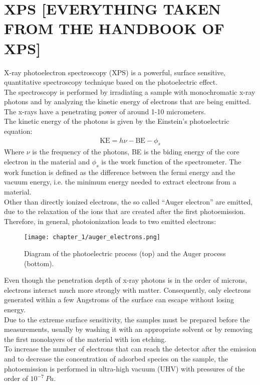 \section{XPS [EVERYTHING TAKEN FROM THE HANDBOOK OF XPS]}
\label{sec:xps}
X-ray photoelectron spectroscopy (XPS) is a powerful, surface sensitive, quantitative spectroscopy technique based on the photoelectric effect.
\\
The spectroscopy is performed by irradiating a sample with monochromatic x-ray photons and by analyzing the kinetic energy of electrons that are being emitted. The x-rays have a penetrating power of around 1-10 micrometers.
\\
The kinetic energy of the photons is given by the Einstein’s photoelectric equation:
\begin{align}
    \mathrm{KE}=h\nu-\mathrm{BE}-\phi_s \label{eq:einstein_ph_eq}
\end{align}
Where $\nu$ is the frequency of the photons, BE is the biding energy of the core electron in the material and $\phi_s$ is the work function of the spectrometer. The work function is defined as the difference between the fermi energy and the vacuum energy, i.e. the minimum energy needed to extract electrons from a material. 
\\
Other than directly ionized electrons, the so called “Auger electron” are emitted, due to the relaxation of the ions that are created after the first photoemission. Therefore, in general, photoionization leads to two emitted electrons:
\begin{figure}[H]
    \centering
    \texttt{[image: chapter\_1/auger\_electrons.png]}
    \vspace*{0pt}
    \caption{Diagram of the photoelectric process (top) and the Auger process (bottom). }
    \label{fig:auger_photoelectric}
\end{figure}
Even though the penetration depth of x-ray photons is in the order of microns, electrons interact much more strongly with matter. Consequently, only electrons generated within a few Angstroms of the surface can escape without losing energy.
\\
Due to the extreme surface sensitivity, the samples must be prepared before the measurements, usually by washing it with an appropriate solvent or by removing the first monolayers of the material with ion etching.
\\
To increase the number of electrons that can reach the detector after the emission and to decrease the concentration of adsorbed species on the sample, the photoemission is performed in ultra-high vacuum (UHV) with pressures of the order of $10^{-7} \: Pa$.
